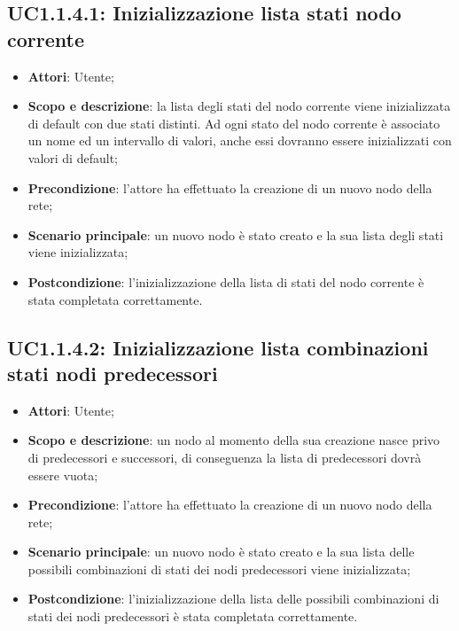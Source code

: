 \subsection{UC1.1.4.1: Inizializzazione lista stati nodo corrente} 
\hypertarget{UC1.1.4.1}{} 
\begin{itemize} 
	\item{\textbf{Attori}: Utente;} 
	\item{\textbf{Scopo e descrizione}: la lista degli stati del nodo corrente viene inizializzata di default con due stati distinti. Ad ogni stato del nodo corrente è associato un nome ed un intervallo di valori, anche essi dovranno essere inizializzati con valori di default;} 
	\item{\textbf{Precondizione}: l'attore ha effettuato la creazione di un nuovo nodo della rete;}
	\item{\textbf{Scenario principale}: un nuovo nodo è stato creato e la sua lista degli stati viene inizializzata;} 
	\item{\textbf{Postcondizione}: l'inizializzazione della lista di stati del nodo corrente è stata completata correttamente.} 
\end{itemize} 
\subsection{UC1.1.4.2: Inizializzazione lista combinazioni stati nodi predecessori} 
\hypertarget{UC1.1.4.2}{} 
\begin{itemize} 
	\item{\textbf{Attori}: Utente;} 
	\item{\textbf{Scopo e descrizione}: un nodo al momento della sua creazione nasce privo di predecessori e successori, di conseguenza la lista di predecessori dovrà essere vuota;} 
	\item{\textbf{Precondizione}: l'attore ha effettuato la creazione di un nuovo nodo della rete;} 
	\item{\textbf{Scenario principale}: un nuovo nodo è stato creato e la sua lista delle possibili combinazioni di stati dei nodi predecessori viene inizializzata;} 
	\item{\textbf{Postcondizione}: l'inizializzazione della lista delle possibili combinazioni di stati dei nodi predecessori è stata completata correttamente.} 
\end{itemize} 
